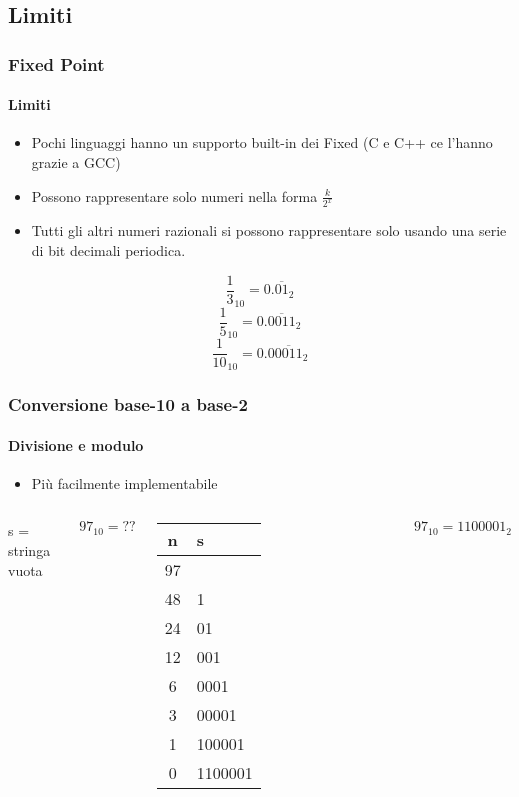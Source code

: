 \documentclass{beamer}
\begin{document}
  \subsection{Limiti}
	\begin{frame}
    \frametitle{Fixed Point}
    \framesubtitle{Limiti}
    \begin{itemize}
			\item Pochi linguaggi hanno un supporto built-in dei Fixed (C e C++ ce l'hanno grazie a GCC)
    		\item Possono rappresentare solo numeri nella forma $\frac{k}{2^x}$
    		\item Tutti gli altri numeri razionali si possono rappresentare
    			solo usando una serie di bit decimali periodica.
    \end{itemize}
    \vspace{1em}
    $$\frac{1}{3}_{10} = 0.\overline{01}_{2}$$
    $$\frac{1}{5}_{10} = 0.\overline{0011}_{2}$$
    $$\frac{1}{10}_{10} = 0.0\overline{0011}_{2}$$
  \end{frame}
  \begin{frame}
    \frametitle{Conversione base-10 a base-2}
    \framesubtitle{Divisione e modulo}
    \begin{itemize}
    		\item Più facilmente implementabile
    \end{itemize}
    \begin{columns}
    \footnotesize{
    \begin{algorithm}[H]
    		\SetAlgoLined
			 s = stringa vuota\;			 
    \end{algorithm}
		}
	 	\footnotesize{		
			\pause
	 		$$97_{10} = ??$$
		  \pause
			\begin{tabular}{|c|l|}
			\hline
			 n & s \\
			\hline
	     97 & \\
	     48 & 1 \\
	     24 & 01 \\
	     12 & 001 \\
	     6 & 0001 \\
	     3 & 00001 \\
	     1 & 100001 \\
	     0 & 1100001 \\
			\hline
			\end{tabular}
		  $$97_{10} = 1100001_{2}$$ 
		}		
	  \end{columns}
		
		
  \end{frame}
\end{document}
